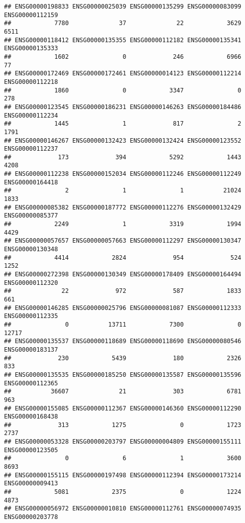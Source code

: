 \documentclass[
]{article}
\begin{document}
\begin{verbatim}
## ENSG00000198833 ENSG00000025039 ENSG00000135299 ENSG00000083099 ENSG00000112159 
##            7780              37              22            3629            6511 
## ENSG00000118412 ENSG00000135355 ENSG00000112182 ENSG00000135341 ENSG00000135333 
##            1602               0             246            6966              77 
## ENSG00000172469 ENSG00000172461 ENSG00000014123 ENSG00000112214 ENSG00000112218 
##            1860               0            3347               0             278 
## ENSG00000123545 ENSG00000186231 ENSG00000146263 ENSG00000184486 ENSG00000112234 
##            1445               1             817               2            1791 
## ENSG00000146267 ENSG00000132423 ENSG00000132424 ENSG00000123552 ENSG00000112237 
##             173             394            5292            1443            4208 
## ENSG00000112238 ENSG00000152034 ENSG00000112246 ENSG00000112249 ENSG00000164418 
##               2               1               1           21024            1833 
## ENSG00000085382 ENSG00000187772 ENSG00000112276 ENSG00000132429 ENSG00000085377 
##            2249               1            3319            1994            4429 
## ENSG00000057657 ENSG00000057663 ENSG00000112297 ENSG00000130347 ENSG00000130348 
##            4414            2824             954             524            1252 
## ENSG00000272398 ENSG00000130349 ENSG00000178409 ENSG00000164494 ENSG00000112320 
##              22             972             587            1833             661 
## ENSG00000146285 ENSG00000025796 ENSG00000081087 ENSG00000112333 ENSG00000112335 
##               0           13711            7300               0           12717 
## ENSG00000135537 ENSG00000118689 ENSG00000118690 ENSG00000080546 ENSG00000183137 
##             230            5439             180            2326             833 
## ENSG00000135535 ENSG00000185250 ENSG00000135587 ENSG00000135596 ENSG00000112365 
##           36607              21             303            6781             963 
## ENSG00000155085 ENSG00000112367 ENSG00000146360 ENSG00000112290 ENSG00000168438 
##             313            1275               0            1723            2737 
## ENSG00000053328 ENSG00000203797 ENSG00000004809 ENSG00000155111 ENSG00000123505 
##               0               6               1            3600            8693 
## ENSG00000155115 ENSG00000197498 ENSG00000112394 ENSG00000173214 ENSG00000009413 
##            5081            2375               0            1224            4873 
## ENSG00000056972 ENSG00000010810 ENSG00000112761 ENSG00000074935 ENSG00000203778 

\end{verbatim}
\end{document}
